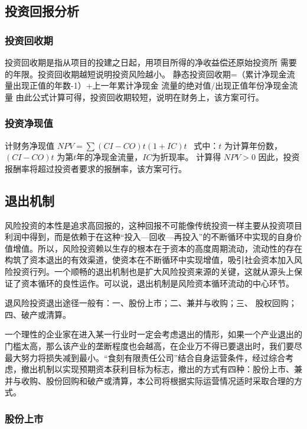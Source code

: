 \documentclass[UTF8,12pt]{ctexart}
\numberwithin{figure}{section}%
\begin{document}
\begin{spacing}{2}
\begin{itemize}
\end{itemize}

\subsection{投资回报分析}
\subsubsection{投资回收期}
投资回收期是指从项目的投建之日起，用项目所得的净收益偿还原始投资所
需要的年限。投资回收期越短说明投资风险越小。 
静态投资回收期=（累计净现金流量出现正值的年数-1）+上一年累计净现金
流量的绝对值/出现正值年份净现金流量  
由此公式计算可得，投资回收期较短，说明在财务上，该方案可行。

\subsubsection{投资净现值}

计财务净现值 $NPV=\sum(CI−CO)t (1+IC)t $  \ 式中：$t$ 为计算年份数，$(CI − 
CO )t$ 为第$ t $年的净现金流量，$IC $为折现率。  
计算得 $NPV>0$ 
因此，投资报酬率将超过投资者要求的报酬率，该方案可行。

\subsection{退出机制}
风险投资的本性是追求高回报的，这种回报不可能像传统投资一样主要从投资项目利润中得到，而是依赖于在这种“投入—回收—再投入”的不断循环中实现的自身价值增值。所以，风险投资赖以生存的根本在于资本的高度周期流动，流动性的存在构筑了资本退出的有效渠道，使资本在不断循环中实现增值，吸引社会资本加入风险投资行列。一个顺畅的退出机制也是扩大风险投资来源的关键，这就从源头上保证了资本循环的良性运作。可以说，退出机制是风险资本循环流动的中心环节。

退风险投资退出途径一般有：一、股份上市；二、兼并与收购；三、 股权回购；四、破产或清算。

一个理性的企业家在进入某一行业时一定会考虑退出的情形，如果一个产业退出的门槛太高，那么该产业的垄断程度也会越高，在企业万不得已要退出时，我们要尽最大努力将损失减到最小。“食刻有限责任公司”结合自身运营条件，经过综合考虑，撤出机制以实现预期资本获利目标为标志，撤出的方式有四种：股份上市、兼并与收购、股份回购和破产或清算，本公司将根据实际运营情况适时采取合理的方式。

\subsubsection{股份上市}


\end{spacing}
\end{document}
